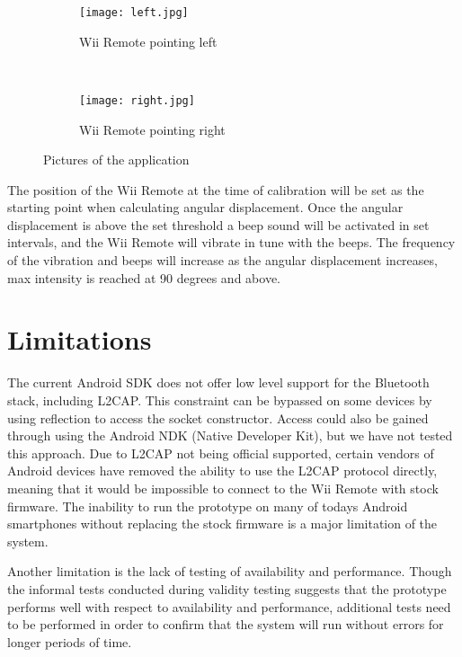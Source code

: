 \begin{figure}[h!]
        \centering
        \begin{subfigure}[b]{0.8\textwidth}
                \centering
                \texttt{[image: left.jpg]}
                \caption{Wii Remote pointing left}
                \label{fig:left}
        \end{subfigure}
        \\%
        \begin{subfigure}[b]{0.8\textwidth}
                \centering
                \texttt{[image: right.jpg]}
                \caption{Wii Remote pointing right}
                \label{fig:right}
        \end{subfigure}
        \caption{Pictures of the application}\label{fig:application}
\end{figure}

The position of the Wii Remote at the time of calibration will be set as the starting point when calculating angular displacement. Once the angular displacement is above the set threshold a beep sound will be activated in set intervals, and the Wii Remote will vibrate in tune with the beeps. The frequency of the vibration and beeps will increase as the angular displacement increases, max intensity is reached at 90 degrees and above.

\section{Limitations}
The current Android SDK does not offer low level support for the Bluetooth stack, including L2CAP. This constraint can be bypassed on some devices by using reflection to access the socket constructor\cite{l2capHtc}. Access could also be gained through using the Android NDK (Native Developer Kit), but we have not tested this approach. Due to L2CAP not being official supported, certain vendors of Android devices have removed the ability to use the L2CAP protocol directly, meaning that it would be impossible to connect to the Wii Remote with stock firmware. The inability to run the prototype on many of todays Android smartphones without replacing the stock firmware is a major limitation of the system.

Another limitation is the lack of testing of availability and performance. Though the informal tests conducted during validity testing suggests that the prototype performs well with respect to availability and performance, additional tests need to be performed in order to confirm that the system will run without errors for longer periods of time.